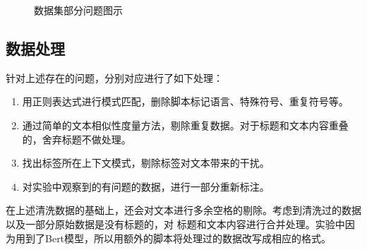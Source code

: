 \documentclass[11pt]{article}
\begin{document}
\vspace{-4mm}
\begin{figure}[!ht]
    \centering



    \vspace{-3mm}
    \caption{数据集部分问题图示{\label{H}}}
\end{figure}


\subsection{数据处理}
针对上述存在的问题，分别对应进行了如下处理：
\begin{enumerate}[label=(\roman*)]
    \item 用正则表达式进行模式匹配，删除脚本标记语言、特殊符号、重复符号等。
    \item 通过简单的文本相似性度量方法，剔除重复数据。对于标题和文本内容重叠的，舍弃标题不做处理。
    \item 找出标签所在上下文模式，剔除标签对文本带来的干扰。
    \item 对实验中观察到的有问题的数据，进行一部分重新标注。
\end{enumerate}
\par
在上述清洗数据的基础上，还会对文本进行多余空格的剔除。考虑到清洗过的数据以及一部分原始数据是没有标题的，对%
标题和文本内容进行合并处理。实验中因为用到了Bert模型，所以用额外的脚本将处理过的数据改写成相应的格式。
\end{document}

